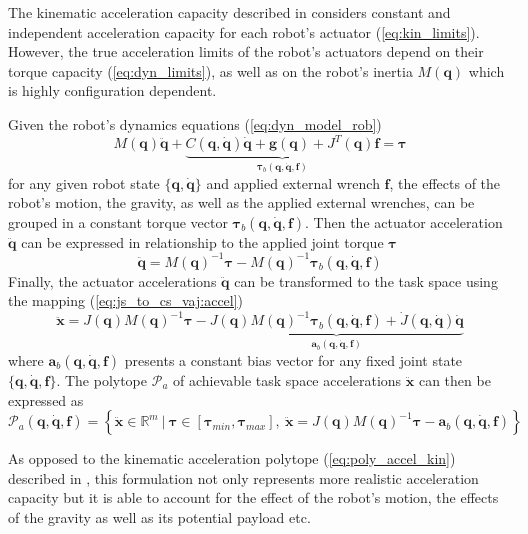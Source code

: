 The kinematic acceleration capacity described in  considers constant and independent acceleration capacity for each robot's actuator (\ref{eq:kin_limits}). However, the true acceleration limits of the robot's actuators depend on their torque capacity (\ref{eq:dyn_limits}), as well as on the robot's inertia 
$M(\bm{q})$ which is highly configuration dependent. 

Given the robot's dynamics equations (\ref{eq:dyn_model_rob}) 
\begin{equation}
M(\bm{q})\ddot{\bm{q}} + \underbrace{C(\bm{q},\dot{\bm{q}})\dot{\bm{q}} + \bm{g}(\bm{q}) + J^T(\bm{q})\bm{f}}_{\bm{\tau}_b(\bm{q},\dot{\bm{q}},\bm{f}) } = \bm{\tau} 
\end{equation}
for any given robot state $\{\bm{q},\dot{\bm{q}}\}$ and applied external wrench $\bm{f}$, the effects of the robot's motion, the gravity, as well as the applied external wrenches, can be grouped in a constant torque vector $\bm{\tau}_b(\bm{q},\dot{\bm{q}},\bm{f})$. Then the actuator acceleration $\ddot{\bm{q}}$ can be expressed in relationship to the applied joint torque $\bm{\tau}$
\begin{equation}
    \ddot{\bm{q}} = M(\bm{q})^{-1}\bm{\tau} - M(\bm{q})^{-1}\bm{\tau}_b(\bm{q},\dot{\bm{q}},\bm{f})
\end{equation}
Finally, the actuator accelerations $\ddot{\bm{q}}$ can be transformed to the task space using the mapping (\ref{eq:js_to_cs_vaj:accel})
\begin{equation}
    \ddot{\bm{x}} = J(\bm{q})M(\bm{q})^{-1}\bm{\tau} - \underbrace{J(\bm{q})M(\bm{q})^{-1}\bm{\tau}_b(\bm{q},\dot{\bm{q}},\bm{f}) + \dot{J}(\bm{q}, \dot{\bm{q}})\dot{\bm{q}}}_{\bm{a}_b(\bm{q},\dot{\bm{q}},\bm{f})}
\end{equation}
where $\bm{a}_b(\bm{q},\dot{\bm{q}},\bm{f})$ presents a constant bias vector for any fixed joint state $\{\bm{q},\dot{\bm{q}},\bm{f}\}$. The polytope $\mathcal{P}_a$ of achievable task space accelerations $\ddot{\bm{x}}$ can then be expressed as
\begin{equation}
    \mathcal{P}_a(\bm{q},\dot{\bm{q}},\bm{f}) = \left\{ \ddot{\bm{x}} \in \mathbb{R}^m ~|~ \bm{\tau}\in\left[\bm{\tau}_{min}, \bm{\tau}_{max} \right], ~ \ddot{\bm{x}} = J(\bm{q})M(\bm{q})^{-1}\bm{\tau} - \bm{a}_b(\bm{q},\dot{\bm{q}},\bm{f}) \right\}
    \label{eq:pol_accleration_rob}
\end{equation}

As opposed to the kinematic acceleration polytope (\ref{eq:poly_accel_kin}) described in , this formulation not only represents more realistic acceleration capacity but it is able to account for the effect of the robot's motion, the effects of the gravity as well as its potential payload etc. 

